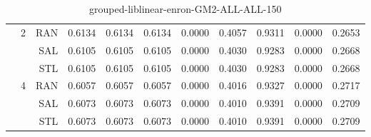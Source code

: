 \begin{center}
\begin{table}[htbp]
\begin{center}
\begin{tabular}{ | r | r | r | r | r | r | r | r | r | r | r |}
 & \multirow{3}{*}{2} & RAN & 0.6134 & 0.6134 & 0.6134 & 0.0000 & 0.4057 & 0.9311 & 0.0000 & 0.2653\\ \cline{3-11}
 &   & SAL & 0.6105 & 0.6105 & 0.6105 & 0.0000 & 0.4030 & 0.9283 & 0.0000 & 0.2668\\ \cline{3-11}
 &   & STL & 0.6105 & 0.6105 & 0.6105 & 0.0000 & 0.4030 & 0.9283 & 0.0000 & 0.2668\\ \cline{2-11}
 & \multirow{3}{*}{4} & RAN & 0.6057 & 0.6057 & 0.6057 & 0.0000 & 0.4016 & 0.9327 & 0.0000 & 0.2717\\ \cline{3-11}
 &   & SAL & 0.6073 & 0.6073 & 0.6073 & 0.0000 & 0.4010 & 0.9391 & 0.0000 & 0.2709\\ \cline{3-11}
 &   & STL & 0.6073 & 0.6073 & 0.6073 & 0.0000 & 0.4010 & 0.9391 & 0.0000 & 0.2709\\ \cline{2-11}
\hline
\end{tabular}
\caption{grouped-liblinear-enron-GM2-ALL-ALL-150}
\end{center}
 \end{table}
\end{center}

